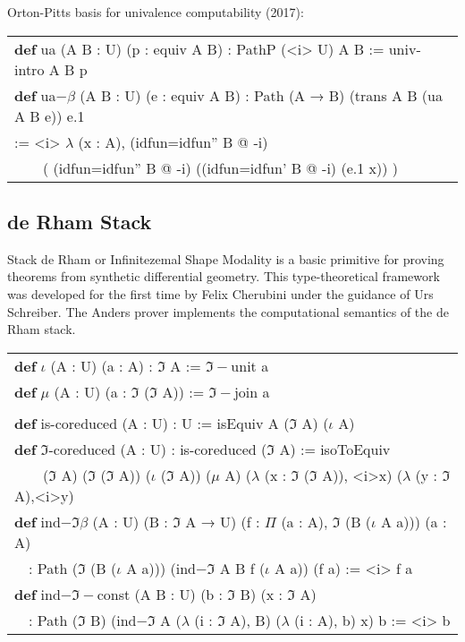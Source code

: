 \documentclass{article}
\theoremstyle{definition}
\newcommand{\tabstyle}[0]{\scriptsize\ttfamily\fontseries{l}\selectfont}
\begin{document}
Orton-Pitts basis for univalence computability (2017):

\begin{table}[ht!]
\tabstyle
\begin{tabular}{l}
\textbf{def} ua (A B : U) (p : equiv A B) : PathP (<i> U) A B := univ-intro A B p \\
\textbf{def} ua$-\beta$ (A B : U) (e : equiv A B) : Path (A → B) (trans A B (ua A B e)) e.1 \\
 := <i> $\lambda$ (x : A), (idfun=idfun'' B @ -i) \\
\ \ \ \ ( (idfun=idfun'' B @ -i) ((idfun=idfun' B @ -i) (e.1 x)) ) \\
\end{tabular}
\end{table}

\newpage
\subsection{de Rham Stack}

Stack de Rham or Infinitezemal Shape Modality is a basic primitive for proving theorems
from synthetic differential geometry. This type-theoretical framework was developed
for the first time by Felix Cherubini under the guidance of Urs Schreiber. The Anders
prover implements the computational semantics of the de Rham stack.

\begin{table}[ht]
\tabstyle
\begin{tabular}{l}
\textbf{def} $\iota$ (A : U) (a : A) : $\Im$ A := $\Im-$unit a \\
\textbf{def} $\mu$ (A : U) (a : $\Im$ ($\Im$ A)) := $\Im-$join a \\
\\
\textbf{def} is-coreduced (A : U) : U := isEquiv A ($\Im$ A) ($\iota$ A) \\
\textbf{def} $\Im$-coreduced (A : U) : is-coreduced ($\Im$ A) := isoToEquiv \\
\ \ \ \ ($\Im$ A) ($\Im$ ($\Im$ A)) ($\iota$ ($\Im$ A)) ($\mu$ A) ($\lambda$ (x : $\Im$ ($\Im$ A)), <i>x) ($\lambda$ (y : $\Im$ A),<i>y) \\
\textbf{def} ind$-\Im\beta$ (A : U) (B : $\Im$ A → U) (f : $\Pi$ (a : A), $\Im$ (B ($\iota$ A a))) (a : A) \\
\ \ : Path ($\Im$ (B ($\iota$ A a))) (ind$-\Im$ A B f ($\iota$ A a)) (f a) := <i> f a \\
\textbf{def} ind$-\Im-$const (A B : U) (b : $\Im$ B) (x : $\Im$ A) \\
\ \ : Path ($\Im$ B) (ind$-\Im$ A ($\lambda$ (i : $\Im$ A), B) ($\lambda$ (i : A), b) x) b := <i> b \\
\end{tabular}
\end{table}
\end{document}

